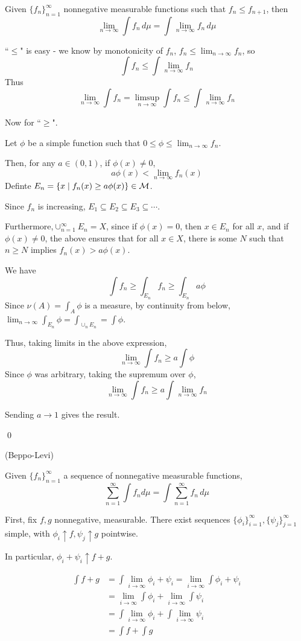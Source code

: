 \documentclass[x11names,reqno,14pt]{extarticle}
\newcommand*{\oo}{\infty}
\newcommand{\seq}[1]{_{#1 = 1}^\oo}
\begin{document}
Given $\{f_n\}\seq{n}$ nonnegative measurable functions such that $f_n\leq f_{n + 1}$, then
\[
\lim_{n\to\oo}\int f_n\,d\mu = \int\lim_{n\to\oo}f_n\,d\mu
\]

\proof

``$\leq$" is easy - we know by monotonicity of $f_n$, $f_n \leq \lim_{n\to\oo}f_n$, so
\[
\int f_n \leq \int\lim_{n\to\oo}f_n
\]
Thus
\[
\lim_{n\to\oo}\int f_n = \limsup_{n\to\oo}\int f_n \leq \int \lim_{n\to\oo}f_n
\]

Now for ``$\geq$". 

Let $\phi$ be a simple function such that $0 \leq \phi \leq \lim_{n\to\oo}f_n$. 

Then, for any $a \in (0, 1)$, if $\phi(x)\neq0$, 
\[
a\phi(x)<\lim_{n\to\oo}f_n(x)
\]
Definte $E_n = \{x \mid f_n(x) \geq a\phi(x)\} \in \mathcal{M}$.

Since $f_n$ is increasing, $E_1\subseteq E_2 \subseteq E_3 \subseteq \cdots$.

Furthermore,$\cup\seq{n}E_n = X$, since if $\phi(x) = 0$, then $x\in E_n$ for all $x$, and if $\phi(x)\neq0$, the above ensures that for all $x \in X$, there is some $N$ such that $n \geq N$ implies $f_n(x) > a\phi(x)$.  

We have 
\[
\int f_n \geq \int_{E_n}f_n \geq \int_{E_n}a\phi
\]
Since $\nu(A) = \int_A\phi$ is a measure, by continuity from below, $\lim_{n\to\oo}\int_{E_n}\phi = \int_{\cup_nE_n} = \int \phi$. 

Thus, taking limits in the above expression, 
\[
\lim_{n\to\oo}\int f_n \geq a\int \phi
\]
Since $\phi$ was arbitrary, taking the supremum over $\phi$,
\[
\lim_{n\to\oo}\int f_n \geq a \int\lim_{n\to\oo}f_n
\]

Sending $a\to 1$ gives the result. 

\qed

\thm (Beppo-Levi)

Given $\{f_n\}\seq{n}$ a sequence of nonnegative measurable functions, 
\[
\sum\seq{n}\int f_nd\mu = \int\sum\seq{n}f_n\,d\mu
\]

\proof

First, fix $f, g$ nonnegative, measurable. There exist sequences $\{\phi_i\}\seq{i}, \{\psi_j\}\seq{j}$ simple, with $\phi_i\uparrow f, \psi_j\uparrow g$ pointwise. 

In particular, $\phi_i + \psi_i \uparrow f + g$. 

\begin{align*}
\int f + g & = \int\lim_{i\to\oo}\phi_i + \psi_i = \lim_{i\to\oo}\int\phi_i + \psi_i \\
			  & = \lim_{i\to\oo}\int\phi_i + \lim_{i\to\oo}\int\psi_i \\
			  & = \int\lim_{i\to\oo}\phi_i + \int\lim_{i\to\oo}\psi_i \\
			  & = \int f + \int g 
\end{align*}
\end{document}
